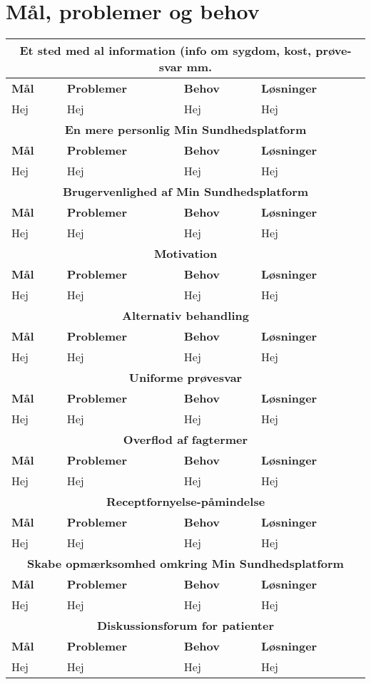 \section{Mål, problemer og behov}
\begin{tabularx}{\textwidth}{|X|X|X|X|}
	\hline
	\multicolumn{4}{|c|}{\textbf{Et sted med al information (info om sygdom, kost, prøve-svar mm.}}\\
	\hline
	\textbf{Mål} & \textbf{Problemer} & \textbf{Behov} & \textbf{Løsninger}\\
	\hline
	Hej&Hej&Hej&Hej\\
	\hline
	\multicolumn{4}{|c|}{\textbf{En mere personlig Min Sundhedsplatform}}\\
	\hline
	\textbf{Mål} & \textbf{Problemer} & \textbf{Behov} & \textbf{Løsninger}\\
	\hline
	Hej&Hej&Hej&Hej\\
	\hline
	\multicolumn{4}{|c|}{\textbf{Brugervenlighed af Min Sundhedsplatform}}\\
	\hline
	\textbf{Mål} & \textbf{Problemer} & \textbf{Behov} & \textbf{Løsninger}\\
	\hline
	Hej&Hej&Hej&Hej\\
	\hline
	\multicolumn{4}{|c|}{\textbf{Motivation}}\\
	\hline
	\textbf{Mål} & \textbf{Problemer} & \textbf{Behov} & \textbf{Løsninger}\\
	\hline
	Hej&Hej&Hej&Hej\\
	\hline
	\multicolumn{4}{|c|}{\textbf{Alternativ behandling}}\\
	\hline
	\textbf{Mål} & \textbf{Problemer} & \textbf{Behov} & \textbf{Løsninger}\\
	\hline
	Hej&Hej&Hej&Hej\\
	\hline
	\multicolumn{4}{|c|}{\textbf{Uniforme prøvesvar}}\\
	\hline
	\textbf{Mål} & \textbf{Problemer} & \textbf{Behov} & \textbf{Løsninger}\\
	\hline
	Hej&Hej&Hej&Hej\\
	\hline
	\multicolumn{4}{|c|}{\textbf{Overflod af fagtermer}}\\
	\hline
	\textbf{Mål} & \textbf{Problemer} & \textbf{Behov} & \textbf{Løsninger}\\
	\hline
	Hej&Hej&Hej&Hej\\
	\hline
	\multicolumn{4}{|c|}{\textbf{Receptfornyelse-påmindelse}}\\
	\hline
	\textbf{Mål} & \textbf{Problemer} & \textbf{Behov} & \textbf{Løsninger}\\
	\hline
	Hej&Hej&Hej&Hej\\
	\hline
	\multicolumn{4}{|c|}{\textbf{Skabe opmærksomhed omkring Min Sundhedsplatform}}\\
	\hline
	\textbf{Mål} & \textbf{Problemer} & \textbf{Behov} & \textbf{Løsninger}\\
	\hline
	Hej&Hej&Hej&Hej\\
	\hline
	\multicolumn{4}{|c|}{\textbf{Diskussionsforum for patienter}}\\
	\hline
	\textbf{Mål} & \textbf{Problemer} & \textbf{Behov} & \textbf{Løsninger}\\
	\hline
	Hej&Hej&Hej&Hej\\
	\hline
\end{tabularx}